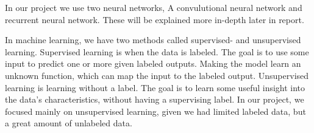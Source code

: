 \noindent
In our project we use two neural networks, A convulutional neural network and recurrent neural network. These will be explained more in-depth later in report.

\noindent
In machine learning, we have two methods called supervised- and unsupervised learning. Supervised learning is when the data is labeled. The goal is to use some input to predict one or more given labeled outputs. Making the model learn an unknown function, which can map the input to the labeled output. Unsupervised learning is learning without a label. The goal is to learn some useful insight into the data's characteristics, without having a supervising label. In our project, we focused mainly on unsupervised learning, given we had limited labeled data, but a great amount of unlabeled data. \\